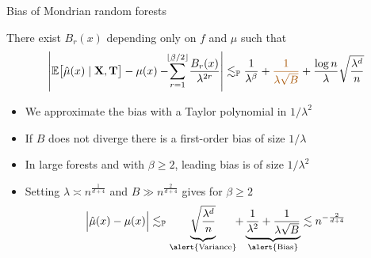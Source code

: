 \documentclass{beamer}
\begin{document}
\begin{frame}{Bias of Mondrian random forests}

  \vspace*{3mm}
  \begin{beamertheorem}%
    There exist $B_r(x)$ depending only on $f$ and $\mu$ such that
    \vspace*{-2mm}
    \begin{align*}
      \left|
      \E \big[ \hat \mu(x) \mid \bX, \bT \big]
      - \mu(x)
      - \hspace*{-1.5mm} \sum_{r=1}^{\lfloor \flbeta / 2 \rfloor}
      \hspace*{-0.5mm}
      \frac{B_r(x)}{\lambda^{2r}}
      \right|
      \lesssim_\P
      \frac{1}{\lambda^\beta}
      + \textcolor{alertcolor}{\frac{1}{\lambda \sqrt B}}
      + \frac{\log n}{\lambda} \sqrt{\frac{\lambda^d}{n}}
    \end{align*}
    \vspace*{-4mm}
  \end{beamertheorem}

  \begin{itemize}

    \item We approximate the bias with a Taylor polynomial
      in $1/\lambda^2$
    \item If $B$ does not diverge
      there is a
      \alert{first-order bias}
      of size $1 / \lambda$

    \item In large forests and with $\beta \geq 2$,
      leading bias is of size $1 / \lambda^2$

    \item Setting
      $\lambda \asymp n^{\frac{1}{d + 4}}$
      and $B \gg n^{\frac{2}{d + 4}}$ gives
      for $\beta \geq 2$
      \vspace*{3mm}
      \begin{align*}
        \Big| \hat \mu(x) - \mu(x) \Big|
        \lesssim_\P
        \underbrace{%
          \sqrt{\frac{\lambda^d}{n}}%
          \vphantom{\frac{1}{\lambda \sqrt B}}%
        }_{\alert{\text{Variance}}}
        \hspace*{-1mm}
        + \underbrace{
          \frac{1}{\lambda^2}
          + \frac{1}{\lambda \sqrt B}
        }_{\alert{\text{Bias}}}
        \lesssim
        n^{-\frac{2}{d+4}}
      \end{align*}

  \end{itemize}

\end{frame}
\end{document}
